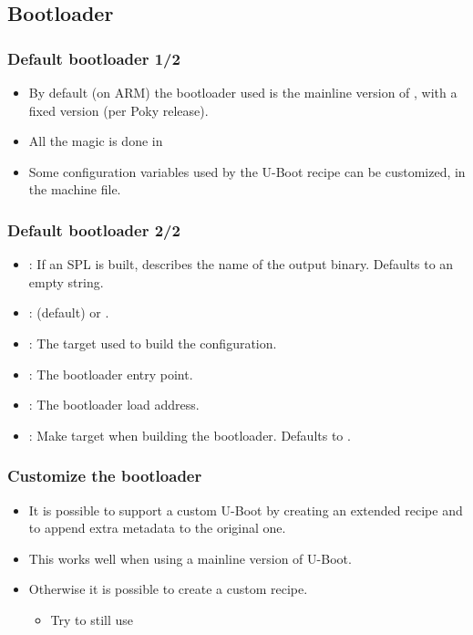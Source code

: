 \subsection{Bootloader}

\begin{frame}
  \frametitle{Default bootloader 1/2}
  \begin{itemize}
    \item By default (on ARM) the bootloader used is the mainline version of
      , with a fixed version (per Poky release).
    \item All the magic is done in
    \item Some configuration variables used by the U-Boot recipe can
      be customized, in the machine file.
  \end{itemize}
\end{frame}

\begin{frame}
  \frametitle{Default bootloader 2/2}
  \begin{itemize}
    \item {}: If an SPL is built, describes the name of the
      output binary. Defaults to an empty string.
    \item {}:  (default) or .
    \item {}: The target used to build the configuration.
    \item {}: The bootloader entry point.
    \item {}: The bootloader load address.
    \item {}: Make target when building the
      bootloader.  Defaults to .
  \end{itemize}
\end{frame}

\begin{frame}
  \frametitle{Customize the bootloader}
  \begin{itemize}
    \item It is possible to support a custom U-Boot by creating an
      extended recipe and to append extra metadata to the original
      one.
    \item This works well when using a mainline version of U-Boot.
    \item Otherwise it is possible to create a custom recipe.
      \begin{itemize}
        \item Try to still use
      \end{itemize}
  \end{itemize}
\end{frame}


